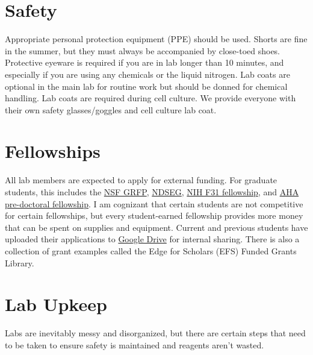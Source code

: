 \documentclass[
]{book}
\begin{document}
\hypertarget{safety}{%
\section{Safety}\label{safety}}

Appropriate personal protection equipment (PPE) should be used. Shorts are fine in the summer, but they must always be accompanied by close-toed shoes. Protective eyeware is required if you are in lab longer than 10 minutes, and especially if you are using any chemicals or the liquid nitrogen. Lab coats are optional in the main lab for routine work but should be donned for chemical handling. Lab coats are required during cell culture. We provide everyone with their own safety glasses/goggles and cell culture lab coat.

\hypertarget{fellowships}{%
\section{Fellowships}\label{fellowships}}

All lab members are expected to apply for external funding. For graduate students, this includes the \href{https://www.nsfgrfp.org/}{NSF GRFP}, \href{https://www.ndsegfellowships.org/about}{NDSEG}, \href{https://researchtraining.nih.gov/programs/fellowships/f31}{NIH F31 fellowship}, and \href{https://professional.heart.org/en/research-programs/application-information/predoctoral-fellowship}{AHA pre-doctoral fellowship}. I am cognizant that certain students are not competitive for certain fellowships, but every student-earned fellowship provides more money that can be spent on supplies and equipment. Current and previous students have uploaded their applications to \href{https://drive.google.com/drive/folders/1j3YPUUUFINandBSU6xtTeN0iOQ3wscMg?usp=sharing}{Google Drive} for internal sharing. There is also a collection of grant examples called the Edge for Scholars (EFS) Funded Grants Library.

\hypertarget{lab-upkeep}{%
\section{Lab Upkeep}\label{lab-upkeep}}

Labs are inevitably messy and disorganized, but there are certain steps that need to be taken to ensure safety is maintained and reagents aren't wasted.
\end{document}
